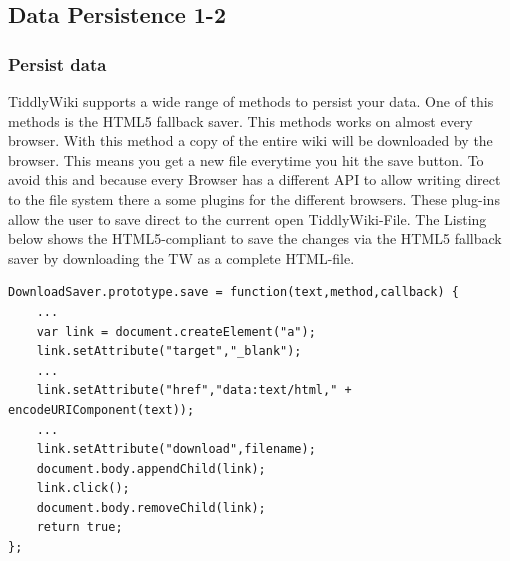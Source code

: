 \documentclass[12pt,a4paper]{article}
\begin{document}
\newpage
\subsection{Data Persistence 1-2}

\subsubsection*{Persist data}
TiddlyWiki supports a wide range of methods to persist your data. One of this methods is the HTML5 fallback saver. This methods works on almost every browser. With this method a copy of the entire wiki will be downloaded by the browser. This means you get a new file everytime you hit the save button.  To avoid this and because every Browser has a different API to allow writing direct to the file system there a some plugins for the different browsers. These plug-ins allow the user to save direct to the current open TiddlyWiki-File. The Listing below shows the HTML5-compliant to save the changes via the HTML5 fallback saver by downloading the TW as a complete HTML-file.
\begin{lstlisting}[caption={Download-Method of TW},label=lst:download]
DownloadSaver.prototype.save = function(text,method,callback) {
	...
	var link = document.createElement("a");
	link.setAttribute("target","_blank");
	...
	link.setAttribute("href","data:text/html," + encodeURIComponent(text));
	...
	link.setAttribute("download",filename);
	document.body.appendChild(link);
	link.click();
	document.body.removeChild(link);
	return true;
};
\end{lstlisting}
\newpage
\end{document}

